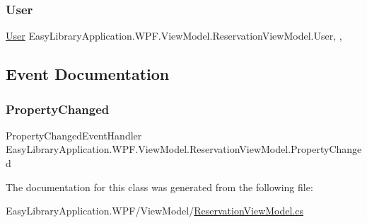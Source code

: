 \subsubsection{\texorpdfstring{User}{User}}
{\footnotesize\ttfamily \mbox{\hyperlink{class_easy_library_application_1_1_w_p_f_1_1_model_1_1_user}{User}} Easy\+Library\+Application.\+W\+P\+F.\+View\+Model.\+Reservation\+View\+Model.\+User\hspace{0.3cm}{\ttfamily [static]}, {\ttfamily [get]}, {\ttfamily [set]}}



\subsection{Event Documentation}
\mbox{\label{class_easy_library_application_1_1_w_p_f_1_1_view_model_1_1_reservation_view_model_a90c36fd9f39b6f746fef9df947b4f78c}} 
\subsubsection{\texorpdfstring{Property\+Changed}{PropertyChanged}}
{\footnotesize\ttfamily Property\+Changed\+Event\+Handler Easy\+Library\+Application.\+W\+P\+F.\+View\+Model.\+Reservation\+View\+Model.\+Property\+Changed}



The documentation for this class was generated from the following file\+:\begin{DoxyCompactItemize}
\item 
Easy\+Library\+Application.\+W\+P\+F/\+View\+Model/\mbox{\hyperlink{_reservation_view_model_8cs}{Reservation\+View\+Model.\+cs}}\end{DoxyCompactItemize}
